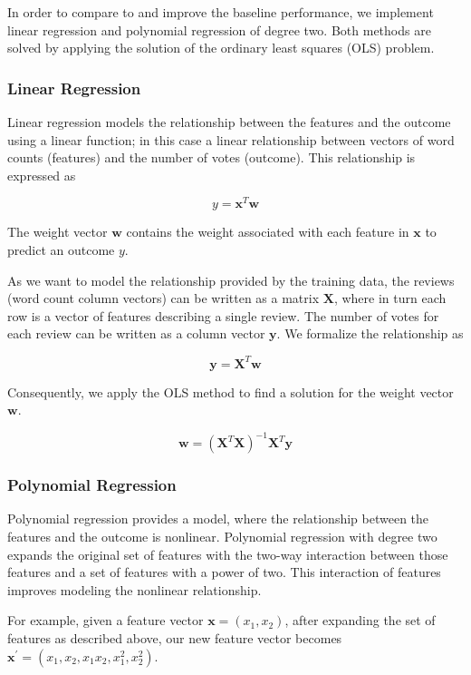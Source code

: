 In order to compare to and improve the baseline performance, we implement linear
regression and polynomial regression of degree two.  Both methods are solved by
applying the solution of the ordinary least squares (OLS) problem.

\subsubsection{Linear Regression}

Linear regression models the relationship between the features and the outcome
using a linear function; in this case a linear relationship between vectors of
word counts (features) and the number of votes (outcome).  This relationship is
expressed as

\[
  y = \mathbf{x}^T\mathbf{w}
\]

The weight vector $\mathbf{w}$ contains the weight associated with each feature
in $\mathbf{x}$ to predict an outcome $y$.

As we want to model the relationship provided by the training data, the reviews
(word count column vectors) can be written as a matrix $\mathbf{X}$, where in
turn each row is a vector of features describing a single review.  The number of
votes for each review can be written as a column vector $\mathbf{y}$.  We
formalize the relationship as

\[
  \mathbf{y} = \mathbf{X}^T \mathbf{w}
\]

Consequently, we apply the OLS method to find a solution for the weight vector
$\mathbf{w}$.

\[
  \mathbf{w} = {(\mathbf{X}^T \mathbf{X})}^{-1} \mathbf{X}^T \mathbf{y}
\]

\subsubsection{Polynomial Regression}

Polynomial regression provides a model, where the relationship between the
features and the outcome is nonlinear.  Polynomial regression with degree two
expands the original set of features with the two-way interaction between those
features and a set of features with a power of two.  This interaction of
features improves modeling the nonlinear relationship.

For example, given a feature vector $\mathbf{x} = (x_1, x_2)$, after expanding
the set of features as described above, our new feature vector becomes
$\mathbf{x}^{'} = (x_1, x_2, x_1x_2, x_1^2, x_2^2)$.

